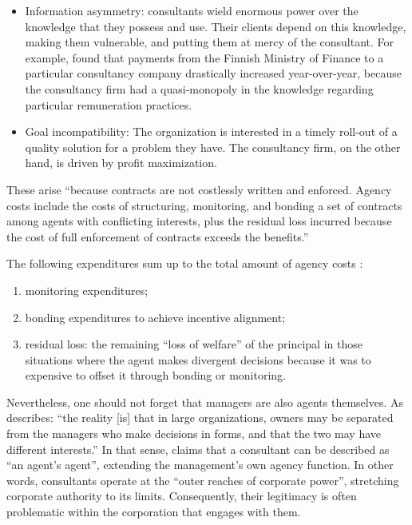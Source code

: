 \documentclass[12pt]{article}
\providecommand{\tightlist}{%
  \setlength{\itemsep}{0pt}\setlength{\parskip}{0pt}}
\begin{document}
\begin{itemize}
\tightlist
\item
  Information asymmetry: consultants wield enormous power over the
  knowledge that they possess and use. Their clients depend on this
  knowledge, making them vulnerable, and putting them at mercy of the
  consultant. \citep{brien1998} For example, \citet[248-249]{ylonen2019}
  found that payments from the Finnish Ministry of Finance to a
  particular consultancy company drastically increased year-over-year,
  because the consultancy firm had a quasi-monopoly in the knowledge
  regarding particular remuneration practices.
\item
  Goal incompatibility: The organization is interested in a timely
  roll-out of a quality solution for a problem they have. The
  consultancy firm, on the other hand, is driven by profit maximization.
\end{itemize}

These arise ``because contracts are not costlessly written and enforced.
Agency costs include the costs of structuring, monitoring, and bonding a
set of contracts among agents with conflicting interests, plus the
residual loss incurred because the cost of full enforcement of contracts
exceeds the benefits.'' \citep[ 327]{fama1983}

The following expenditures sum up to the total amount of agency costs
\citep[ 308]{jensen1976}:

\begin{enumerate}
\def\labelenumi{\arabic{enumi}.}
\tightlist
\item
  monitoring expenditures;
\item
  bonding expenditures to achieve incentive alignment;
\item
  residual loss: the remaining ``loss of welfare'' of the principal in
  those situations where the agent makes divergent decisions because it
  was to expensive to offset it through bonding or monitoring.
\end{enumerate}

Nevertheless, one should not forget that managers are also agents
themselves. As \citet[584]{tosi1997} describes: ``the reality {[}is{]}
that in large organizations, owners may be separated from the managers
who make decisions in forms, and that the two may have different
interests.'' In that sense, \citet{fincham2002} claims that a consultant
can be described as ``an agent's agent'', extending the management's own
agency function. In other words, consultants operate at the ``outer
reaches of corporate power'', stretching corporate authority to its
limits. Consequently, their legitimacy is often problematic within the
corporation that engages with them.
\end{document}
